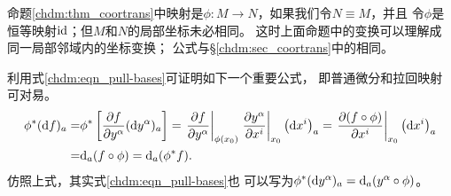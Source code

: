 命题\ref{chdm:thm_coortrans}中映射是$\phi:M\to N$，如果我们令$N\equiv M$，并且
令$\phi$是恒等映射${\rm id}$；但$M$和$N$的局部坐标未必相同。
这时上面命题中的变换可以理解成同一局部邻域内的{\kaishu 坐标变换}；
公式与\S\ref{chdm:sec_coortrans}中的相同。

利用式\eqref{chdm:eqn_pull-bases}可证明如下一个重要公式，
即普通微分和拉回映射可对易。
\begin{align}
    {\phi ^*} ({\rm d} f)_a =& {\phi ^*} \left[ \frac{ \partial f  } 
      {\partial y^\alpha} ({\rm d} y^\alpha)_a  \right]
    = \left. \frac{ \partial f }{\partial y^\alpha} \right|_{\phi(x_0)}
      \left. \frac{{\partial {y^\alpha }}}{{\partial {x^i}}} \right|_{x_0}
      \left( {{\rm{d}}{x^i }} \right)_a 
    = \left. \frac{ \partial (f \circ \phi) }{\partial x^i} \right|_{x_0}
      \left( {{\rm{d}}{x^i }} \right)_a  \notag\\
    =& {\rm d}_a (f \circ \phi) ={\rm d}_a ({\phi ^*}f) . \label{chdm:eqn_dfphi}
\end{align}
仿照上式，其实式\eqref{chdm:eqn_pull-bases}也
可以写为${\phi ^*} ({\rm d} y^\alpha)_a = {\rm d}_a (y^\alpha \circ \phi)$。

